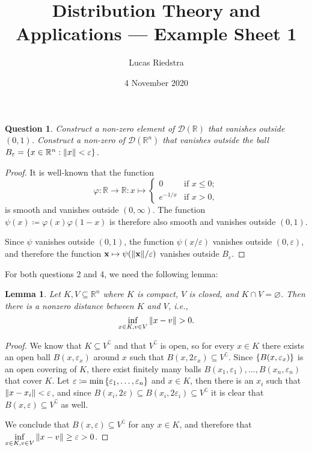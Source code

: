 \documentclass{article}
\title{Distribution Theory and Applications --- Example Sheet 1} %
\author{Lucas Riedstra}
\date{4 November 2020} %
\theoremstyle{plain}
\newtheorem{question}{Question}
\newtheorem{lemma}{Lemma}
\theoremstyle{remark}
\renewcommand{\vec}{\mathbf}
\renewcommand{\emptyset}{\varnothing}
\renewcommand{\epsilon}{\varepsilon}
\renewcommand{\phi}{\varphi}
\newcommand{\Bb}{\mathbb}
\newcommand{\Cal}{\mathcal}
\newcommand{\RR}{\Bb R}
\newcommand{\DD}{\Cal D}
\newcommand{\C}{^\complement} %
\newcommand\ceq\coloneqq %
\newcommand\eps\epsilon
\begin{document}
\maketitle

\begin{question}
	Construct a non-zero element of $\DD(\RR)$ that vanishes outside $(0, 1)$. Construct a non-zero of $\DD(\RR^n)$ that vanishes outside the ball $B_\eps = \qty{x \in \RR^n : \norm{x} < \eps}$. 
\end{question}

\begin{proof}
	It is well-known that the function 
	\[
	\phi \colon \RR \to \RR \colon x \mapsto \begin{cases}
		0 &\text{if $x \leq 0$}; \\
		e^{-1/x} &\text{if $x > 0$},
	\end{cases}
	\]
	is smooth and vanishes outside $(0, \infty)$. The function $\psi(x) \ceq \phi(x)\phi(1-x)$ is therefore also smooth and vanishes outside $(0, 1)$.  
	
	Since $\psi$ vanishes outside $(0, 1)$, the function $\psi(x/\eps)$ vanishes outside $(0, \eps)$, and therefore the function $\vec x \mapsto \psi(\norm{\vec x}/\eps)$ vanishes outside $B_\eps$. 
\end{proof}

\begin{mdframed}
For both questions 2 and 4, we need the following lemma:
\begin{lemma} \label{lem:distance_compact_closed}
	Let $K, V \subseteq \RR^n$ where $K$ is compact, $V$ is closed, and $K \cap V = \emptyset$. Then there is a nonzero distance between $K$ and $V$, i.e., 
	\[
	\inf_{x \in K, v \in V} \norm{x - v} > 0. 
	\]
\end{lemma}

\begin{proof}
	We know that $K \subseteq V\C$ and that $V\C$ is open, so for every $x \in K$ there exists an open ball $B(x, \eps_x)$ around $x$ such that $B(x, 2\eps_x) \subseteq V\C$. Since $\qty{B(x, \eps_x)}$ is an open covering of $K$, there exist finitely many balls $B(x_1, \eps_1), \dotsc, B(x_n, \eps_n)$ that cover $K$. Let $\eps \ceq \min\qty{\eps_1, \dotsc, \eps_n}$ and $x \in K$, then there is an $x_i$ such that $\norm{x - x_i} < \eps$, and since $B(x_i, 2\eps) \subseteq B(x_i, 2\eps_i) \subseteq V\C$ it is clear that $B(x, \eps) \subseteq V\C$ as well. 
	
	We conclude that $B(x, \eps) \subseteq V\C$ for any $x \in K$, and therefore that $\inf\limits_{x \in K, v \in V} \norm{x - v} \geq \eps > 0$. 
\end{proof}
\end{mdframed}
\end{document}
